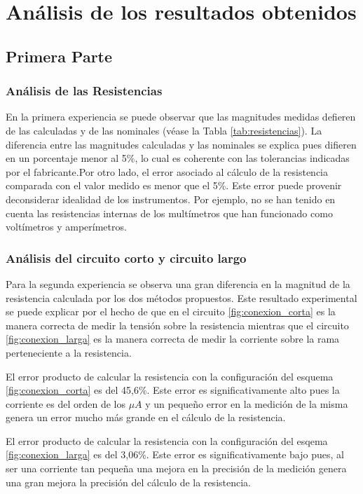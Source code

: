 
\section{Análisis de los resultados obtenidos}

\subsection{Primera Parte}

\subsubsection{Análisis de las Resistencias}


    En la primera experiencia se puede observar que las magnitudes medidas defieren de las
    calculadas y de las nominales (véase la Tabla \ref{tab:resistencias}). La diferencia entre las magnitudes calculadas y las nominales se explica pues difieren en un porcentaje menor al 5\%, lo cual es coherente con las tolerancias indicadas por el fabricante.Por otro lado, el error asociado al cálculo de la resistencia comparada con el valor medido es menor que el 5\%. Este error puede provenir deconsiderar idealidad de los instrumentos. Por ejemplo, no se han tenido en cuenta las resistencias internas de los multímetros que han funcionado como voltímetros y amperímetros. 

\subsubsection{Análisis del circuito corto y circuito largo}

    Para la segunda experiencia se observa una gran diferencia en la magnitud de la resistencia calculada por los dos métodos propuestos. Este resultado experimental se puede explicar por el hecho de que en el circuito \ref{fig:conexion_corta} es la manera correcta de medir la tensión sobre la resistencia mientras que el circuito \ref{fig:conexion_larga} es la manera correcta de medir la corriente sobre la rama perteneciente a la resistencia. 

    El error producto de calcular la resistencia con la configuración del esquema \ref{fig:conexion_corta} es del 45,6\%. Este error es significativamente alto pues la corriente es del orden de los $\mu A$ y un pequeño error en la medición de la misma genera un error mucho más grande en el cálculo de la resistencia. 

    El error producto de calcular la resistencia con la configuración del esqema \ref{fig:conexion_larga} es del 3,06\%. Este error es significativamente bajo pues, al ser una corriente tan pequeña una mejora en la precisión de la medición genera una gran mejora la precisión del cálculo de la resistencia. 
    

